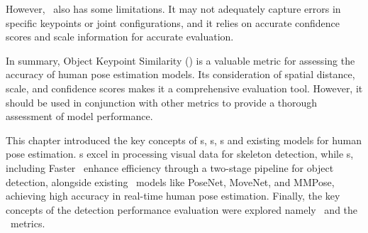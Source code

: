 However, \OKS\ also has some limitations. It may not adequately capture errors in specific keypoints or joint configurations, and it relies on accurate confidence scores and scale information for accurate evaluation.

In summary, Object Keypoint Similarity (\OKS) is a valuable metric for assessing the accuracy of human pose estimation models. Its consideration of spatial distance, scale, and confidence scores makes it a comprehensive evaluation tool. However, it should be used in conjunction with other metrics to provide a thorough assessment of model performance.

This chapter introduced the key concepts of \NN\-s, \CNN\-s, \RCNN\-s and existing models for human pose estimation. \CNN\-s excel in processing visual data for skeleton detection, while \RCNN\-s, including Faster \RCNN\, enhance efficiency through a two-stage pipeline for object detection, alongside existing \NN\ models like PoseNet, MoveNet, and MMPose, achieving high accuracy in real-time human pose estimation. Finally, the key concepts of the detection performance evaluation were explored namely \APE\ and the \MSE\ metrics.
